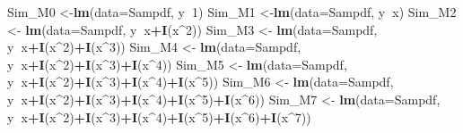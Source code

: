 \documentclass[]{book}
\newenvironment{Shaded}{\begin{snugshade}}{\end{snugshade}}
\newcommand{\KeywordTok}[1]{\textcolor[rgb]{0.13,0.29,0.53}{\textbf{#1}}}
\newcommand{\DataTypeTok}[1]{\textcolor[rgb]{0.13,0.29,0.53}{#1}}
\newcommand{\DecValTok}[1]{\textcolor[rgb]{0.00,0.00,0.81}{#1}}
\newcommand{\StringTok}[1]{\textcolor[rgb]{0.31,0.60,0.02}{#1}}
\newcommand{\OperatorTok}[1]{\textcolor[rgb]{0.81,0.36,0.00}{\textbf{#1}}}
\newcommand{\NormalTok}[1]{#1}
\begin{document}
\begin{Shaded}
\begin{Highlighting}[]
\NormalTok{Sim_M0 <-}\KeywordTok{lm}\NormalTok{(}\DataTypeTok{data=}\NormalTok{Sampdf, y}\OperatorTok{~}\DecValTok{1}\NormalTok{)}
\NormalTok{Sim_M1 <-}\KeywordTok{lm}\NormalTok{(}\DataTypeTok{data=}\NormalTok{Sampdf, y}\OperatorTok{~}\NormalTok{x)}
\NormalTok{Sim_M2 <-}\StringTok{ }\KeywordTok{lm}\NormalTok{(}\DataTypeTok{data=}\NormalTok{Sampdf, y}\OperatorTok{~}\NormalTok{x}\OperatorTok{+}\KeywordTok{I}\NormalTok{(x}\OperatorTok{^}\DecValTok{2}\NormalTok{))}
\NormalTok{Sim_M3 <-}\StringTok{ }\KeywordTok{lm}\NormalTok{(}\DataTypeTok{data=}\NormalTok{Sampdf, y}\OperatorTok{~}\NormalTok{x}\OperatorTok{+}\KeywordTok{I}\NormalTok{(x}\OperatorTok{^}\DecValTok{2}\NormalTok{)}\OperatorTok{+}\KeywordTok{I}\NormalTok{(x}\OperatorTok{^}\DecValTok{3}\NormalTok{))}
\NormalTok{Sim_M4 <-}\StringTok{ }\KeywordTok{lm}\NormalTok{(}\DataTypeTok{data=}\NormalTok{Sampdf, y}\OperatorTok{~}\NormalTok{x}\OperatorTok{+}\KeywordTok{I}\NormalTok{(x}\OperatorTok{^}\DecValTok{2}\NormalTok{)}\OperatorTok{+}\KeywordTok{I}\NormalTok{(x}\OperatorTok{^}\DecValTok{3}\NormalTok{)}\OperatorTok{+}\KeywordTok{I}\NormalTok{(x}\OperatorTok{^}\DecValTok{4}\NormalTok{))}
\NormalTok{Sim_M5 <-}\StringTok{ }\KeywordTok{lm}\NormalTok{(}\DataTypeTok{data=}\NormalTok{Sampdf, y}\OperatorTok{~}\NormalTok{x}\OperatorTok{+}\KeywordTok{I}\NormalTok{(x}\OperatorTok{^}\DecValTok{2}\NormalTok{)}\OperatorTok{+}\KeywordTok{I}\NormalTok{(x}\OperatorTok{^}\DecValTok{3}\NormalTok{)}\OperatorTok{+}\KeywordTok{I}\NormalTok{(x}\OperatorTok{^}\DecValTok{4}\NormalTok{)}\OperatorTok{+}\KeywordTok{I}\NormalTok{(x}\OperatorTok{^}\DecValTok{5}\NormalTok{))}
\NormalTok{Sim_M6 <-}\StringTok{ }\KeywordTok{lm}\NormalTok{(}\DataTypeTok{data=}\NormalTok{Sampdf, y}\OperatorTok{~}\NormalTok{x}\OperatorTok{+}\KeywordTok{I}\NormalTok{(x}\OperatorTok{^}\DecValTok{2}\NormalTok{)}\OperatorTok{+}\KeywordTok{I}\NormalTok{(x}\OperatorTok{^}\DecValTok{3}\NormalTok{)}\OperatorTok{+}\KeywordTok{I}\NormalTok{(x}\OperatorTok{^}\DecValTok{4}\NormalTok{)}\OperatorTok{+}\KeywordTok{I}\NormalTok{(x}\OperatorTok{^}\DecValTok{5}\NormalTok{)}\OperatorTok{+}\KeywordTok{I}\NormalTok{(x}\OperatorTok{^}\DecValTok{6}\NormalTok{))}
\NormalTok{Sim_M7 <-}\StringTok{ }\KeywordTok{lm}\NormalTok{(}\DataTypeTok{data=}\NormalTok{Sampdf, y}\OperatorTok{~}\NormalTok{x}\OperatorTok{+}\KeywordTok{I}\NormalTok{(x}\OperatorTok{^}\DecValTok{2}\NormalTok{)}\OperatorTok{+}\KeywordTok{I}\NormalTok{(x}\OperatorTok{^}\DecValTok{3}\NormalTok{)}\OperatorTok{+}\KeywordTok{I}\NormalTok{(x}\OperatorTok{^}\DecValTok{4}\NormalTok{)}\OperatorTok{+}\KeywordTok{I}\NormalTok{(x}\OperatorTok{^}\DecValTok{5}\NormalTok{)}\OperatorTok{+}\KeywordTok{I}\NormalTok{(x}\OperatorTok{^}\DecValTok{6}\NormalTok{)}\OperatorTok{+}\KeywordTok{I}\NormalTok{(x}\OperatorTok{^}\DecValTok{7}\NormalTok{))}

\end{Highlighting}
\end{Shaded}
\end{document}
